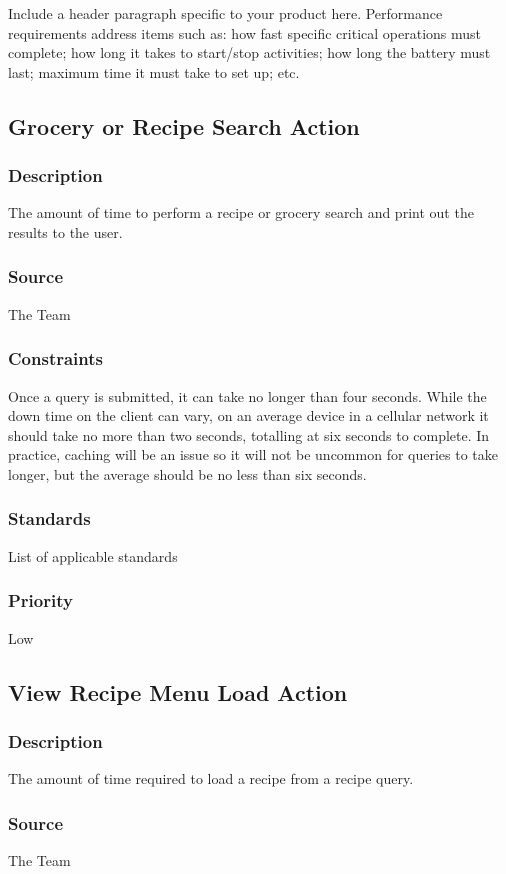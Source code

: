 Include a header paragraph specific to your product here. Performance requirements address items such as: how fast specific critical operations must complete; how long it takes to start/stop activities; how long the battery must last; maximum time it must take to set up; etc.

\subsection{Grocery or Recipe Search Action}
\subsubsection{Description}
The amount of time to perform a recipe or grocery search and print out the results to the user.
\subsubsection{Source}
The Team
\subsubsection{Constraints}
Once a query is submitted, it can take no longer than four seconds.  
While the down time on the client can vary, on an average device in a cellular network it should take no more than two seconds, totalling at six seconds to complete.
In practice, caching will be an issue so it will not be uncommon for queries to take longer, but the average should be no less than six seconds.
\subsubsection{Standards}
List of applicable standards
\subsubsection{Priority}
Low

\subsection{View Recipe Menu Load Action}
\subsubsection{Description}
The amount of time required to load a recipe from a recipe query.
\subsubsection{Source}
The Team

